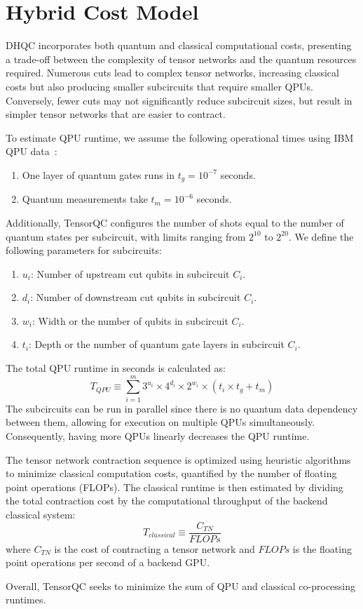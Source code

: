 \section{Hybrid Cost Model}\label{sec:cost_model}
DHQC incorporates both quantum and classical computational costs,
presenting a trade-off between the complexity of tensor networks and the quantum resources required.
Numerous cuts lead to complex tensor networks,
increasing classical costs but also producing smaller subcircuits that require smaller QPUs.
Conversely, fewer cuts may not significantly reduce subcircuit sizes,
but result in simpler tensor networks that are easier to contract.

To estimate QPU runtime,
we assume the following operational times using IBM QPU data~\cite{ibm_quantum}:
\begin{enumerate}
    \item One layer of quantum gates runs in $t_g=10^{-7}$ seconds.
    \item Quantum measurements take $t_m=10^{-6}$ seconds.
\end{enumerate}

Additionally, TensorQC configures the number of shots equal to the number of quantum states per subcircuit,
with limits ranging from $2^{10}$ to $2^{20}$.
We define the following parameters for subcircuits:
\begin{enumerate}
    \item $u_i$: Number of upstream cut qubits in subcircuit $C_i$.
    \item $d_i$: Number of downstream cut qubits in subcircuit $C_i$.
    \item $w_i$: Width or the number of qubits in subcircuit $C_i$.
    \item $t_i$: Depth or the number of quantum gate layers in subcircuit $C_i$.
\end{enumerate}
The total QPU runtime in seconds is calculated as:
\begin{equation}
    T_{QPU}\equiv \sum_{i=1}^m 3^{u_i}\times4^{d_i}\times2^{w_i}\times(t_i\times t_g + t_m)\label{eq:qpu_runtime}
\end{equation}
The subcircuits can be run in parallel since there is no quantum data dependency between them,
allowing for execution on multiple QPUs simultaneously.
Consequently, having more QPUs linearly decreases the QPU runtime.

The tensor network contraction sequence is optimized using heuristic algorithms to minimize classical computation costs,
quantified by the number of floating point operations (FLOPs).
The classical runtime is then estimated by dividing the total contraction cost by the computational throughput of the backend classical system:
\begin{equation}
    T_{classical}\equiv \frac{C_{TN}}{FLOPs}\label{eq:classical_runtime}
\end{equation}
where $C_{TN}$ is the cost of contracting a tensor network and $FLOPs$ is the floating point operations per second of a backend GPU.

Overall, TensorQC seeks to minimize the sum of QPU and classical co-processing runtimes.